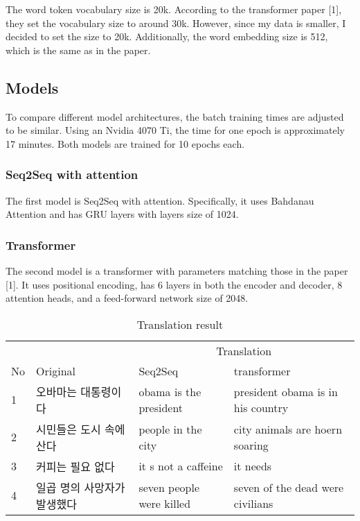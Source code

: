 \documentclass{article}
\begin{document}
The word token vocabulary size is 20k. According to the transformer paper [1], they set the vocabulary size to around 30k. However, since my data is smaller, I decided to set the size to 20k. Additionally, the word embedding size is 512, which is the same as in the paper.

\subsection{Models}
To compare different model architectures, the batch training times are adjusted to be similar. Using an Nvidia 4070 Ti, the time for one epoch is approximately 17 minutes. Both models are trained for 10 epochs each.

\subsubsection{Seq2Seq with attention}
The first model is Seq2Seq with attention. Specifically, it uses Bahdanau Attention and has GRU layers with layers size of 1024. 

\subsubsection{Transformer}
The second model is a transformer with parameters matching those in the paper [1]. It uses positional encoding, has 6 layers in both the encoder and decoder, 8 attention heads, and a feed-forward network size of 2048.

\begin{table}
  \caption{Translation result}
  \label{sample-table}
  \centering
  \begin{tabular}{l l l l}
    \toprule
    \multicolumn{2}{r}{} & \multicolumn{2}{c}{Translation} \\      
    \cmidrule(r){3-4}
    No & Original     & Seq2Seq     & transformer \\
    \midrule
    1 & 오바마는 대통령이다 & obama is the president & president obama is in his country \\
    2 & 시민들은 도시 속에 산다 & people in the city & city animals are hoern soaring \\
    3 & 커피는 필요 없다 & it s not a caffeine & it needs \\
    4 & 일곱 명의 사망자가 발생했다 & seven people were killed  & seven of the dead were civilians\\
    \bottomrule
  \end{tabular}
\end{table}
\end{document}
